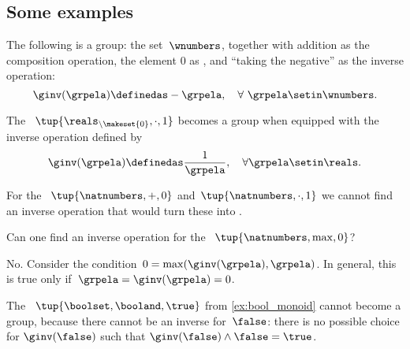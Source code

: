 \subsection{Some examples}

\begin{example}
    The following is a group: the set~$\wnumbers$, together with addition as the composition operation, the element $0$ as , and ``taking the negative'' as the inverse operation:
    \begin{equation}
        \ginv(\grpela) \definedas -\grpela, \quad \forall \ \grpela \setin \wnumbers.
    \end{equation}
\end{example}
\begin{example}
    The  ~$\tup{\reals_{\backslash \makeset{0}}, {{\cdot}},  1}$ becomes a group when equipped with the inverse operation defined by
    \begin{equation}
        \ginv(\grpela) \definedas \frac{1}{\grpela}, \quad \forall \grpela \setin \reals.
    \end{equation}
\end{example}

\begin{example}
    For the ~$\tup{\natnumbers, {{+}}, 0}$ and~$\tup{\natnumbers, {{\cdot}}, 1}$ we cannot find an inverse operation that would turn these  into .
\end{example}

\begin{exercise}
    Can one find an inverse operation for the  ~$\tup{\natnumbers,\max,0}$?
\end{exercise}
%
\begin{solution}
    No.
    Consider the condition~$0=\max(\ginv(\grpela),\grpela)$.
    In general, this is true only if~$\grpela=\ginv(\grpela)=0$.
\end{solution}

\begin{example}
    The  ~$\tup{\boolset,\booland, \true}$ from \cref{ex:bool_monoid} cannot become a group, because there cannot be an inverse for~$\false$: there is no possible choice for $\ginv(\false)$ such that $\ginv(\false)\wedge \false=\true$.
\end{example}

